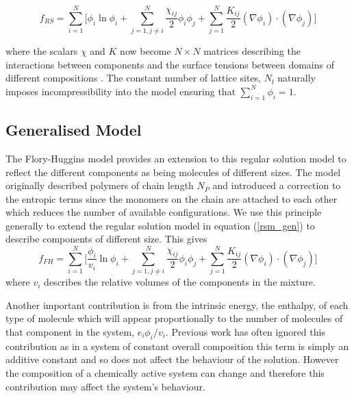 \begin{equation}
    f_{RS} = \sum_{i=1}^{N}\Bigg[\phi_i\ln\phi_i+\sum_{j=1, j\neq i}^{N}\frac{\chi_{ij}}{2}\phi_i\phi_j + \sum_{j=1}^{N} \frac{K_{ij}}{2}(\nabla\phi_i)\cdot(\nabla\phi_j)\Bigg]
    \label{rsm_gen}
\end{equation}

where the scalars $\chi$ and $K$ now become $N \times N$ matrices describing the interactions between components and the surface tensions between domains of different compositions \cite{berry_physical_2018}. The constant number of lattice sites, $N_l$ naturally imposes incompressibility into the model ensuring that $\sum_{i=1}^N\phi_i=1$.

\subsection{\label{sec:multi_fh}Generalised Model}
The Flory-Huggins model provides an extension to this regular solution model to reflect the different components as being molecules of different sizes. The model originally described polymers of chain length $N_P$ and introduced a correction to the entropic terms since the monomers on the chain are attached to each other which reduces the number of available configurations. We use this principle generally to extend the regular solution model in equation (\ref{rsm_gen}) to describe components of different size. This gives
\begin{equation}
    f_{FH} = \sum_{i=1}^{N}\Bigg[\frac{\phi_i}{v_i}\ln\phi_i+\sum_{j=1, j\neq i}^{N}\frac{\chi_{ij}}{2}\phi_i\phi_j + \sum_{j=1}^{N} \frac{K_{ij}}{2}(\nabla\phi_i)\cdot(\nabla\phi_j)\Bigg]
    \label{fh_gen}
\end{equation}
where $v_i$ describes the relative volumes of the components in the mixture. 

Another important contribution is from the intrinsic energy, the enthalpy, of each type of molecule which will appear proportionally to the number of molecules of that component in the system, $e_i \phi_i / v_i$. Previous work has often ignored this contribution as in a system of constant overall composition this term is simply an additive constant and so does not affect the behaviour of the solution. However the composition of a chemically active system can change and therefore this contribution may affect the system's behaviour.

